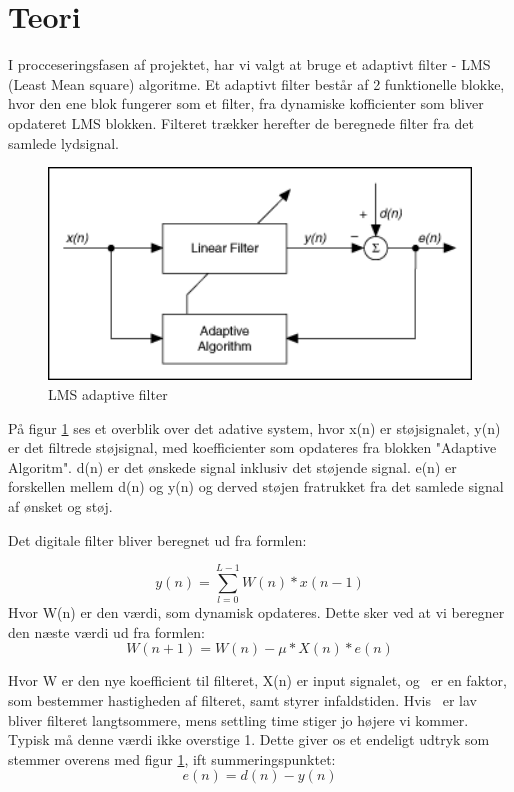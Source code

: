 \graphicspath{{Chapters/Indledning/}}


\section{Teori}
I procceseringsfasen af projektet, har vi valgt at bruge et adaptivt filter - LMS (Least Mean square) algoritme. Et adaptivt filter består af 2 funktionelle blokke, hvor den ene blok fungerer som et filter, fra dynamiske kofficienter som bliver opdateret LMS blokken.  Filteret trækker herefter de beregnede filter fra det samlede lydsignal. 
   

\begin{figure}[H]
	\centering
	\includegraphics[width = 400pt]{Img/Figures}
	\caption{LMS adaptive filter}
	\label{fig:LMS_filter}
\end{figure}

På figur \ref{fig:LMS_filter} ses et overblik over det adative system, hvor x(n) er støjsignalet, y(n) er det filtrede støjsignal, med koefficienter som opdateres fra blokken "Adaptive Algoritm". d(n) er det ønskede signal inklusiv det støjende signal. e(n) er forskellen mellem d(n) og y(n) og derved støjen fratrukket fra det samlede signal af ønsket og støj.  \newline


Det digitale filter bliver beregnet ud fra formlen:

\begin{equation}
  y(n) = \displaystyle\sum_{l=0}^{L-1} W(n)*x(n-1)
\end{equation}
Hvor W(n) er den værdi, som dynamisk opdateres. Dette sker ved at vi beregner den næste værdi ud fra formlen: 
\begin{equation}
  W(n+1) = W(n)-\mu *X(n)*e(n)
\end{equation}

Hvor W er den nye koefficient til filteret, X(n) er input signalet, og \textmu\ er en faktor, som bestemmer hastigheden af filteret, samt styrer infaldstiden. Hvis \textmu\ er lav bliver filteret langtsommere, mens settling time stiger jo højere vi kommer. Typisk må denne værdi ikke overstige 1. 
\newline
Dette giver os et endeligt udtryk som stemmer overens med figur \ref{fig:LMS_filter}, ift summeringspunktet: 
\begin{equation}
  e(n) = d(n)-y(n)
\end{equation}